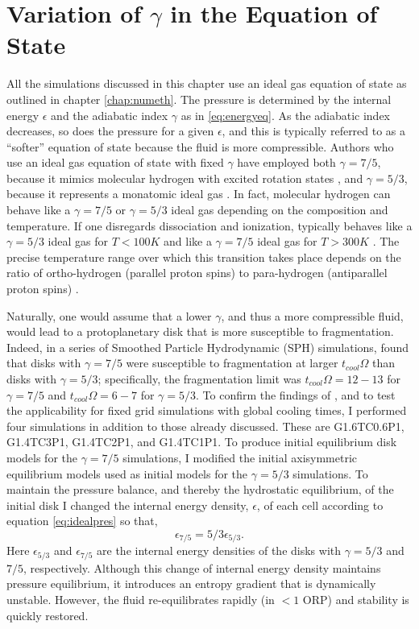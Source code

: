 \section{Variation of $\gamma$ in the Equation of State}\label{sec:IC:gamma}

All the simulations discussed in this chapter use an ideal gas equation of state as outlined in chapter \ref{chap:numeth}. The pressure is determined by the internal energy $\epsilon$ and the adiabatic index $\gamma$ as in \eqref{eq:energyeq}. As the adiabatic index decreases, so does the pressure for a given $\epsilon$, and this is typically referred to as a ``softer'' equation of state because the fluid is more compressible. Authors who use an ideal gas equation of state with fixed $\gamma$ have employed both $\gamma = 7/5$, because it mimics molecular hydrogen with excited rotation states \citep{boss1998b}, and $\gamma = 5/3$, because it represents a monatomic ideal gas \citep{pickett1998}. In fact, molecular hydrogen  can behave like a $\gamma = 7/5$ or $\gamma =5/3$ ideal gas depending on the composition and temperature. If one disregards dissociation and ionization,  typically behaves like a $\gamma = 5/3$ ideal gas for $T < 100K$ and like a $\gamma = 7/5$ ideal gas for $T > 300K$ \citep{decampli1978}. The precise temperature range over which this transition takes place depends on the ratio of ortho-hydrogen (parallel proton spins) to para-hydrogen (antiparallel proton spins) \citep{boley2007a}.

Naturally, one would assume that a lower $\gamma$, and thus a more compressible fluid, would lead to a protoplanetary disk that is more susceptible to fragmentation. Indeed, in a series of Smoothed Particle Hydrodynamic (SPH) simulations, \citet{rice2005} found that disks with $\gamma = 7/5$ were susceptible to fragmentation at larger $t_{cool} \Omega$ than disks with $\gamma =5/3$; specifically, the fragmentation limit was $t_{cool} \Omega = 12-13$ for $\gamma = 7/5$ and $t_{cool}\Omega = 6-7$ for $\gamma = 5/3$. To confirm the findings of \citeauthor{rice2005}, and to test the applicability for fixed grid simulations with global cooling times, I performed four simulations in addition to those already discussed. These are G1.6TC0.6P1, G1.4TC3P1, G1.4TC2P1, and G1.4TC1P1. To produce initial equilibrium disk models for the $\gamma = 7/5$ simulations, I modified the initial axisymmetric equilibrium models used as initial models for the $\gamma = 5/3$ simulations. To maintain the pressure balance, and thereby the hydrostatic equilibrium, of the initial disk I changed the internal energy density, $\epsilon$, of each cell according to equation \eqref{eq:idealpres} so that, 
\begin{equation}
\epsilon_{7/5} = 5/3 \epsilon_{5/3}.
\end{equation}
Here $\epsilon_{5/3}$ and $\epsilon_{7/5}$ are the internal energy densities of the disks with $\gamma = 5/3$ and $7/5$, respectively. Although this change of internal energy density maintains pressure equilibrium, it introduces an entropy gradient that is dynamically unstable. However, the fluid re-equilibrates rapidly (in $< 1$ ORP) and stability is quickly restored.

